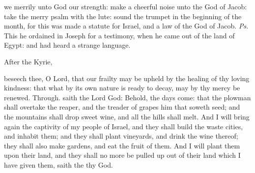 \vspace{-0.25\baselineskip}

\introit

\vspace{-0.1\baselineskip}

 we merrily unto God our strength: make a cheerful noise unto the God of Jacob: take the merry psalm with the lute: sound the trumpet in the beginning of the month, for this was made a statute for Israel, and a law of the God of Jacob. \textit{Ps.} This he ordained in Joseph for a testimony, when he came out of the land of Egypt: and had heard a strange language.
\begin{rubric}
    After the Kyrie,
\end{rubric}

\vspace{-0.25\baselineskip}

\collect

\vspace{-0.1\baselineskip}

 beseech thee, O Lord, that our frailty may be upheld by the healing of thy loving kindness: that what by its own nature is ready to decay, may by thy mercy be renewed. Through.
 saith the Lord God: Behold, the days come: that the plowman shall overtake the reaper, and the treader of grapes him that soweth seed; and the mountains shall drop sweet wine, and all the hills shall melt. And I will bring again the captivity of my people of Israel, and they shall build the waste cities, and inhabit them; and they shall plant vineyards, and drink the wine thereof; they shall also make gardens, and eat the fruit of them. And I will plant them upon their land, and they shall no more be pulled up out of their land which I have given them, saith the  thy God.
\\


